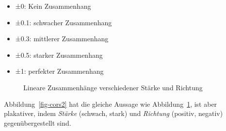 \documentclass[
  letterpaper,
  twoside,
  open=any]{scrbook}
\providecommand{\tightlist}{%
  \setlength{\itemsep}{0pt}\setlength{\parskip}{0pt}}\usepackage{longtable,booktabs,array}
\theoremstyle{definition}
\theoremstyle{definition}
\theoremstyle{definition}
\theoremstyle{remark}
\begin{document}
\begin{itemize}
\tightlist
\item
  ±0: Kein Zusammenhang
\item
  ±0.1: schwacher Zusammenhang
\item
  ±0.3: mittlerer Zusammenhang
\item
  ±0.5: starker Zusammenhang
\item
  ±1: perfekter Zusammenhang
\end{itemize}

\begin{figure}


\caption{\label{fig-cors}Lineare Zusammenhänge verschiedener Stärke und
Richtung}

\end{figure}%

Abbildung~\ref{fig-cors2} hat die gleiche Aussage wie
Abbildung~\ref{fig-cors}, ist aber plakativer, indem \emph{Stärke}
(schwach, stark) und \emph{Richtung} (positiv, negativ)
gegenübergestellt sind.
\end{document}
